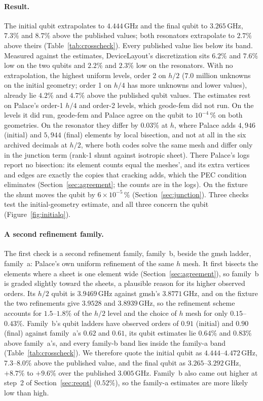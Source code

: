 \documentclass{anvil-paper}
\begin{document}
\paragraph{Result.}
The initial qubit extrapolates to $4.444$\,GHz and the final qubit to
$3.265$\,GHz, $7.3\%$ and $8.7\%$ above the published values; both
resonators extrapolate to $2.7\%$ above theirs
(Table~\ref{tab:crosscheck}). Every published value lies below its band.
Measured against the estimates, DeviceLayout's discretization sits $6.2\%$
and $7.6\%$ low on the two qubits and $2.2\%$ and $2.3\%$ low on the
resonators. With no extrapolation, the highest uniform levels, order 2
on $h/2$ ($7.0$ million unknowns on the initial geometry; order 1 on $h/4$
has more unknowns and lower values), already lie $4.2\%$ and $4.7\%$ above
the published qubit values. The estimates rest
on Palace's order-1 $h/4$ and order-2 levels, which geode-fem did not run.
On the levels it did run, geode-fem and Palace agree on the qubit to
$10^{-4}\,\%$ on both geometries. On the resonator they differ by $0.03\%$
at $h$, where Palace adds $4{,}946$ (initial) and $5{,}944$ (final)
elements by local bisection, and not at all in the six archived decimals
at $h/2$, where both codes solve the same mesh and differ only in the
junction term (rank-1 shunt against isotropic sheet). There Palace's logs
report no bisection: its element counts equal the meshes', and its extra
vertices and edges are exactly the copies that cracking adds, which the PEC
condition eliminates (Section~\ref{sec:agreement}; the counts are in the
logs). On the fixture the shunt moves the qubit by
$6\times10^{-5}\,\%$ (Section~\ref{sec:junction}). Three checks test the initial-geometry estimate, and all three concern
the qubit (Figure~\ref{fig:initialq}).

\paragraph{A second refinement family.}
The first check is a second refinement family, family~b, beside the gmsh
ladder, family~a: Palace's own uniform refinement of the same $h$ mesh. It
first bisects the elements where a sheet is one element wide
(Section~\ref{sec:agreement}), so family~b is graded slightly toward the
sheets, a plausible reason for its higher observed orders. Its $h/2$ qubit is $3.9469$\,GHz against
gmsh's $3.8771$\,GHz, and on the fixture the two refinements give $3.9528$
and $3.8939$\,GHz, so the refinement scheme accounts for $1.5$--$1.8\%$ of
the $h/2$ level and the choice of $h$ mesh for only $0.15$--$0.43\%$.
Family~b's qubit ladders have observed orders of $0.91$ (initial) and
$0.90$ (final) against family~a's $0.62$ and $0.61$, its qubit estimates lie $0.64\%$
and $0.83\%$ above family~a's, and every family-b band lies inside the
family-a band (Table~\ref{tab:crosscheck}). We therefore quote the initial
qubit as $4.444$--$4.472$\,GHz, $7.3$--$8.0\%$ above the published value,
and the final qubit as $3.265$--$3.292$\,GHz, $+8.7\%$ to $+9.6\%$ over the
published $3.005$\,GHz. Family~b also came out higher at step~2 of
Section~\ref{sec:reopt} ($0.52\%$), so the family-a estimates are more
likely low than high.
\end{document}
